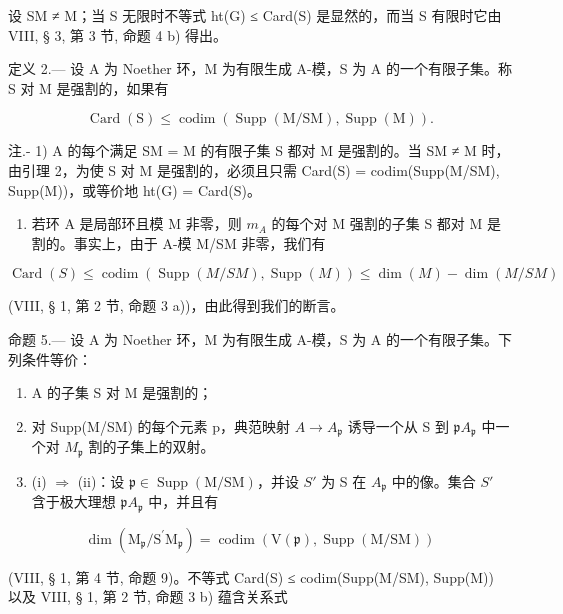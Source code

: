 设 SM ≠ M；当 S 无限时不等式 ht(G) ≤ Card(S) 是显然的，而当 S 有限时它由 VIII, § 3, 第 3 节, 命题 4 b) 得出。

定义 2.--- 设 A 为 Noether 环，M 为有限生成 A-模，S 为 A 的一个有限子集。称 S 对 M 是强割的，如果有

\[
\operatorname{Card} (\mathrm{S}) \leqslant \operatorname{codim} (\operatorname{Supp} (\mathrm{M} / \mathrm{SM}), \operatorname{Supp} (\mathrm{M})) .
\]

注.- 1) A 的每个满足 SM = M 的有限子集 S 都对 M 是强割的。当 SM ≠ M 时，由引理 2，为使 S 对 M 是强割的，必须且只需 Card(S) = codim(Supp(M/SM), Supp(M))，或等价地 ht(G) = Card(S)。

\begin{enumerate}
\def\labelenumi{\arabic{enumi})}
\setcounter{enumi}{1}
\tightlist
\item
  若环 A 是局部环且模 M 非零，则 \(m_{A}\) 的每个对 M 强割的子集 S 都对 M 是割的。事实上，由于 A-模 M/SM 非零，我们有
\end{enumerate}

\[
\operatorname{Card} (S) \leqslant \operatorname{codim} (\operatorname{Supp} (M / S M), \operatorname{Supp} (M)) \leqslant \dim (M) - \dim (M / S M)
\]

(VIII, § 1, 第 2 节, 命题 3 a))，由此得到我们的断言。

命题 5.--- 设 A 为 Noether 环，M 为有限生成 A-模，S 为 A 的一个有限子集。下列条件等价：

\begin{enumerate}
\def\labelenumi{(\roman{enumi})}
\item
  A 的子集 S 对 M 是强割的；
\item
  对 Supp(M/SM) 的每个元素 p，典范映射 \(A \to A_{\mathfrak{p}}\) 诱导一个从 S 到 \(\mathfrak{p}A_{\mathfrak{p}}\) 中一个对 \(M_{\mathfrak{p}}\) 割的子集上的双射。
\item
  (i) \(\Rightarrow\) (ii)：设 \(\mathfrak{p} \in \operatorname{Supp}(\mathrm{M} / \mathrm{SM})\)，并设 \(S'\) 为 S 在 \(A_{\mathfrak{p}}\) 中的像。集合 \(S'\) 含于极大理想 \(\mathfrak{p} A_{\mathfrak{p}}\) 中，并且有
\end{enumerate}

\[
\dim (\mathrm{M} _ {\mathfrak {p}} / \mathrm{S} ^ {\prime} \mathrm{M} _ {\mathfrak {p}}) = \operatorname{codim} (\mathrm{V} (\mathfrak {p}), \operatorname{Supp} (\mathrm{M} / \mathrm{SM}))
\]

(VIII, § 1, 第 4 节, 命题 9)。不等式 Card(S) ≤ codim(Supp(M/SM), Supp(M)) 以及 VIII, § 1, 第 2 节, 命题 3 b) 蕴含关系式

